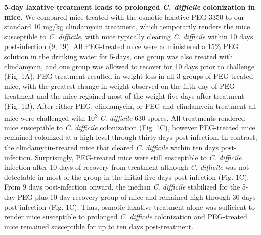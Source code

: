 \documentclass[
  11pt,
]{article}
\begin{document}
\textbf{5-day laxative treatment leads to prolonged \emph{C. difficile}
colonization in mice.} We compared mice treated with the osmotic
laxative PEG 3350 to our standard 10 mg/kg clindamycin treatment, which
temporarily renders the mice susceptible to \emph{C. difficile}, with
mice typically clearing \emph{C. difficile} within 10 days
post-infection (9, 19). All PEG-treated mice were administered a 15\%
PEG solution in the drinking water for 5-days, one group was also
treated with clindamycin, and one group was allowed to recover for 10
days prior to challenge (Fig. 1A). PEG treatment resulted in weight loss
in all 3 groups of PEG-treated mice, with the greatest change in weight
observed on the fifth day of PEG treatment and the mice regained most of
the weight five days after treatment (Fig. 1B). After either PEG,
clindamycin, or PEG and clindamycin treatment all mice were challenged
with 10\textsuperscript{3} \emph{C. difficile} 630 spores. All
treatments rendered mice susceptible to \emph{C. difficile} colonization
(Fig. 1C), however PEG-treated mice remained colonized at a high level
through thirty days post-infection. In contrast, the clindamycin-treated
mice that cleared \emph{C. difficile} within ten days post-infection.
Surprisingly, PEG-treated mice were still susceptible to \emph{C.
difficile} infection after 10-days of recovery from treatment although
\emph{C. difficile} was not detectable in most of the group in the
initial five days post-infection (Fig. 1C). From 9 days post-infection
onward, the median \emph{C. difficile} stabilized for the 5-day PEG plus
10-day recovery group of mice and remained high through 30 days
post-infection (Fig. 1C). Thus, osmotic laxative treatment alone was
sufficient to render mice susceptible to prolonged \emph{C. difficile}
colonization and PEG-treated mice remained susceptible for up to ten
days post-treatment.
\end{document}
